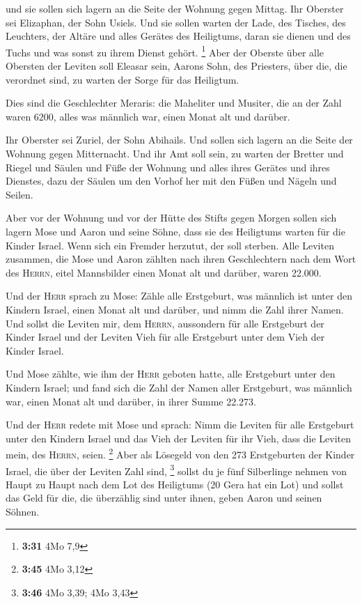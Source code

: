  und sie sollen sich lagern an die Seite der Wohnung
gegen Mittag.  Ihr Oberster sei Elizaphan, der Sohn
Usiels.  Und sie sollen warten der Lade, des Tisches, des
Leuchters, der Altäre und alles Gerätes des Heiligtums, daran sie dienen
und des Tuchs und was sonst zu ihrem Dienst gehört. \footnote{\textbf{3:31}
  4Mo 7,9}  Aber der Oberste über alle Obersten der
Leviten soll Eleasar sein, Aarons Sohn, des Priesters, über die, die
verordnet sind, zu warten der Sorge für das Heiligtum.

 Dies sind die Geschlechter Meraris: die Maheliter und
Musiter,  die an der Zahl waren 6200, alles was männlich
war, einen Monat alt und darüber.

 Ihr Oberster sei Zuriel, der Sohn Abihails. Und sollen
sich lagern an die Seite der Wohnung gegen Mitternacht. 
Und ihr Amt soll sein, zu warten der Bretter und Riegel und Säulen und
Füße der Wohnung und alles ihres Gerätes und ihres Dienstes,
 dazu der Säulen um den Vorhof her mit den Füßen und
Nägeln und Seilen.

 Aber vor der Wohnung und vor der Hütte des Stifts gegen
Morgen sollen sich lagern Mose und Aaron und seine Söhne, dass sie des
Heiligtums warten für die Kinder Israel. Wenn sich ein Fremder herzutut,
der soll sterben.  Alle Leviten zusammen, die Mose und
Aaron zählten nach ihren Geschlechtern nach dem Wort des \textsc{Herrn},
eitel Mannsbilder einen Monat alt und darüber, waren 22.000.

 Und der \textsc{Herr} sprach zu Mose: Zähle alle
Erstgeburt, was männlich ist unter den Kindern Israel, einen Monat alt
und darüber, und nimm die Zahl ihrer Namen.  Und sollst
die Leviten mir, dem \textsc{Herrn}, aussondern für alle Erstgeburt der
Kinder Israel und der Leviten Vieh für alle Erstgeburt unter dem Vieh
der Kinder Israel.

 Und Mose zählte, wie ihm der \textsc{Herr} geboten
hatte, alle Erstgeburt unter den Kindern Israel;  und
fand sich die Zahl der Namen aller Erstgeburt, was männlich war, einen
Monat alt und darüber, in ihrer Summe 22.273.

 Und der \textsc{Herr} redete mit Mose und sprach:
 Nimm die Leviten für alle Erstgeburt unter den Kindern
Israel und das Vieh der Leviten für ihr Vieh, dass die Leviten mein, des
\textsc{Herrn}, seien. \footnote{\textbf{3:45} 4Mo 3,12} 
Aber als Lösegeld von den 273 Erstgeburten der Kinder Israel, die über
der Leviten Zahl sind, \footnote{\textbf{3:46} 4Mo 3,39; 4Mo 3,43}
 sollst du je fünf Silberlinge nehmen von Haupt zu Haupt
nach dem Lot des Heiligtums (20 Gera hat ein Lot)  und
sollst das Geld für die, die überzählig sind unter ihnen, geben Aaron
und seinen Söhnen.

